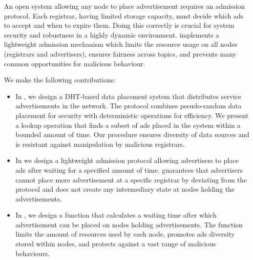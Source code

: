 
An open system allowing any node to place advertisement requires an admission protocol. Each registrar, having limited storage capacity, must decide which ads to accept and when to expire them. Doing this correctly is crucial for system security and robustness in a highly dynamic environment. \sysname implements a lightweight admission mechanism which limits the resource usage on all nodes (registrars and advertisers), ensures fairness across topics, and prevents many common opportunities for malicious behaviour.

 We make the following contributions:
\begin{itemize}
    \item In , we design a DHT-based data placement system that distributes service advertisements in the network. The protocol combines pseudo-random data placement for security with deterministic operations for efficiency. We present a lookup operation that finds a subset of ads placed in the system within a bounded amount of time. Our procedure ensures diversity of data sources and is resistant against manipulation by malicious registrars. 
    \item In  we design a lightweight admission protocol allowing advertisers to place ads after waiting for a specified amount of time. %
    \sysname guarantees that advertisers cannot place more advertisement at a specific registrar by deviating from the protocol %
    and does not create any intermediary state at nodes holding the advertisements.
    
    \item In , we design a function that calculates a waiting time after which advertisement can be placed on nodes holding advertisements. The function limits the amount of resources used by each node, promotes ads diversity stored within nodes, and protects against a vast range of malicious behaviours. 
\end{itemize}

